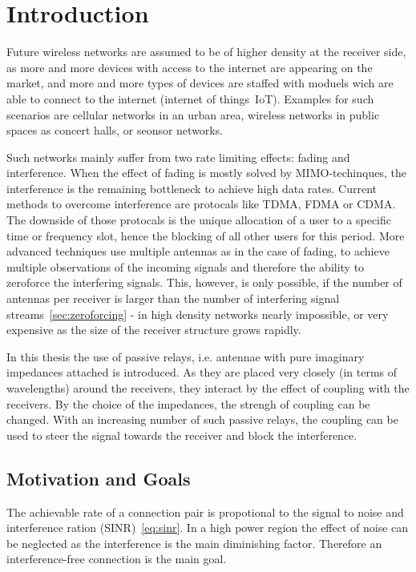 \chapter{Introduction}
\label{sec:introduction}

Future wireless networks are assumed to be of higher density at the receiver side, as more and more devices with access to the internet are appearing on the market, and more and more types of devices are staffed with moduels wich are able to connect to the internet (internet of things~IoT).
Examples for such scenarios are cellular networks in an urban area, wireless networks in public spaces as concert halls, or seonsor networks.

Such networks mainly suffer from two rate limiting  effects: fading and interference.
When the effect of fading is mostly solved by MIMO-techinques, the interference is the remaining bottleneck to achieve high data rates.
Current methods to overcome interference are protocals like TDMA, FDMA or CDMA.
The downside of those protocals is the unique allocation of a user to a specific time or frequency slot, hence the blocking of all other users for this period.
More advanced techniques use multiple antennas as in the case of fading, to achieve multiple observations of the incoming signals and therefore the ability to zeroforce the interfering signals.
This, however, is only possible, if the number of antennas per receiver is larger than the number of interfering signal streams~\ref{sec:zeroforcing}
 - in high density networks nearly impossible, or very expensive as the size of the receiver structure grows rapidly.

In this thesis the use of passive relays, i.e. antennae with pure imaginary impedances attached is introduced.
As they are placed very closely (in terms of wavelengths) around the receivers, they interact by the effect of coupling with the receivers.
By the choice of the impedances, the strengh of coupling can be changed.
With an increasing number of such passive relays, the coupling can be used to steer the signal towards the receiver and block the interference.

\section{Motivation and Goals}
\label{sec:motivation}

The achievable rate of a connection pair is propotional to the signal to noise and interference ration (SINR)~\eqref{eq:sinr}.
In a high power region the effect of noise can be neglected as the interference is the main diminishing factor.
Therefore an interference-free connection is the main goal.

